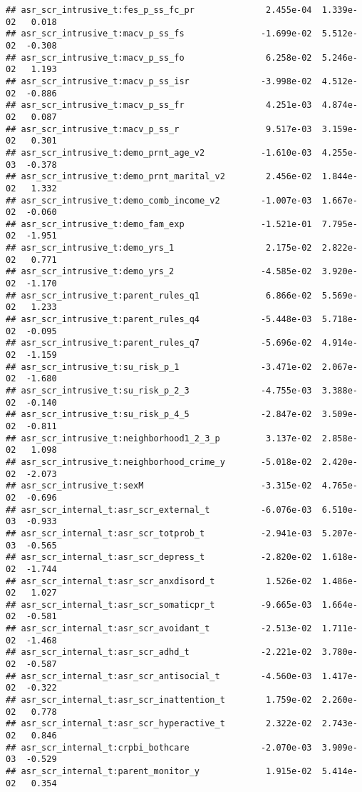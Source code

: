 \documentclass[
]{article}
\begin{document}
\begin{verbatim}
## asr_scr_intrusive_t:fes_p_ss_fc_pr              2.455e-04  1.339e-02   0.018
## asr_scr_intrusive_t:macv_p_ss_fs               -1.699e-02  5.512e-02  -0.308
## asr_scr_intrusive_t:macv_p_ss_fo                6.258e-02  5.246e-02   1.193
## asr_scr_intrusive_t:macv_p_ss_isr              -3.998e-02  4.512e-02  -0.886
## asr_scr_intrusive_t:macv_p_ss_fr                4.251e-03  4.874e-02   0.087
## asr_scr_intrusive_t:macv_p_ss_r                 9.517e-03  3.159e-02   0.301
## asr_scr_intrusive_t:demo_prnt_age_v2           -1.610e-03  4.255e-03  -0.378
## asr_scr_intrusive_t:demo_prnt_marital_v2        2.456e-02  1.844e-02   1.332
## asr_scr_intrusive_t:demo_comb_income_v2        -1.007e-03  1.667e-02  -0.060
## asr_scr_intrusive_t:demo_fam_exp               -1.521e-01  7.795e-02  -1.951
## asr_scr_intrusive_t:demo_yrs_1                  2.175e-02  2.822e-02   0.771
## asr_scr_intrusive_t:demo_yrs_2                 -4.585e-02  3.920e-02  -1.170
## asr_scr_intrusive_t:parent_rules_q1             6.866e-02  5.569e-02   1.233
## asr_scr_intrusive_t:parent_rules_q4            -5.448e-03  5.718e-02  -0.095
## asr_scr_intrusive_t:parent_rules_q7            -5.696e-02  4.914e-02  -1.159
## asr_scr_intrusive_t:su_risk_p_1                -3.471e-02  2.067e-02  -1.680
## asr_scr_intrusive_t:su_risk_p_2_3              -4.755e-03  3.388e-02  -0.140
## asr_scr_intrusive_t:su_risk_p_4_5              -2.847e-02  3.509e-02  -0.811
## asr_scr_intrusive_t:neighborhood1_2_3_p         3.137e-02  2.858e-02   1.098
## asr_scr_intrusive_t:neighborhood_crime_y       -5.018e-02  2.420e-02  -2.073
## asr_scr_intrusive_t:sexM                       -3.315e-02  4.765e-02  -0.696
## asr_scr_internal_t:asr_scr_external_t          -6.076e-03  6.510e-03  -0.933
## asr_scr_internal_t:asr_scr_totprob_t           -2.941e-03  5.207e-03  -0.565
## asr_scr_internal_t:asr_scr_depress_t           -2.820e-02  1.618e-02  -1.744
## asr_scr_internal_t:asr_scr_anxdisord_t          1.526e-02  1.486e-02   1.027
## asr_scr_internal_t:asr_scr_somaticpr_t         -9.665e-03  1.664e-02  -0.581
## asr_scr_internal_t:asr_scr_avoidant_t          -2.513e-02  1.711e-02  -1.468
## asr_scr_internal_t:asr_scr_adhd_t              -2.221e-02  3.780e-02  -0.587
## asr_scr_internal_t:asr_scr_antisocial_t        -4.560e-03  1.417e-02  -0.322
## asr_scr_internal_t:asr_scr_inattention_t        1.759e-02  2.260e-02   0.778
## asr_scr_internal_t:asr_scr_hyperactive_t        2.322e-02  2.743e-02   0.846
## asr_scr_internal_t:crpbi_bothcare              -2.070e-03  3.909e-03  -0.529
## asr_scr_internal_t:parent_monitor_y             1.915e-02  5.414e-02   0.354

\end{verbatim}
\end{document}
